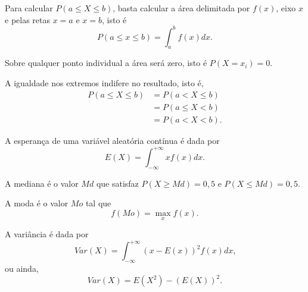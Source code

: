 \documentclass[11pt,fleqn]{book}
\numberwithin{mpicture}{chapter}
\numberwithin{mtable}{chapter}
\numberwithin{mframe}{chapter}
\begin{document}
\begin{remark}
	Para calcular $P(a\leqslant X \leqslant b)$, basta calcular a área delimitada por $f(x)$, eixo $x$ e pelas retas $x=a$ e $x=b$, isto é
	\begin{equation}
		P(a\leqslant x \leqslant b) = \int_{a}^{b} f(x)dx
		\text{.}
	\end{equation}
\end{remark}

\begin{remark}
	Sobre qualquer ponto individual a área será zero, isto é $P(X=x_i)=0$.
\end{remark}

\begin{remark}
	A igualdade nos extremos indifere no resultado, isto é,
	\begin{align*}
		P(a\leqslant X \leqslant b) &= P(a < X \leqslant b)\\
							  		 &=P(a\leqslant X < b)\\
									 &=P(a<X<b)\text{.}
	\end{align*}
\end{remark}

\begin{definition}
	A esperança de uma variável aleatória contínua é dada por
	\begin{equation}
		E(X)=\int_{-\infty}^{+\infty} xf(x)dx
		\text{.}
	\end{equation}
\end{definition}

\begin{definition}
	A mediana é o valor $Md$ que satisfaz $P(X\geqslant Md)=0,5$ e $P(X\leqslant Md)=0,5$.
\end{definition}

\begin{definition}
	A moda é o valor $Mo$ tal que
	\begin{equation}
		f(Mo)=\max_x f(x)
		\text{.}
	\end{equation}
\end{definition}

\begin{definition}
	A variância é dada por
	\begin{equation}
		Var(X)=\int_{-\infty}^{+\infty} (x-E(x))^2 f(x) dx
		\text{,}
	\end{equation}
	ou ainda,
	\begin{equation}
		Var(X)=E(X^2)-(E(X))^2
		\text{.}
	\end{equation}
\end{definition}
\end{document}

